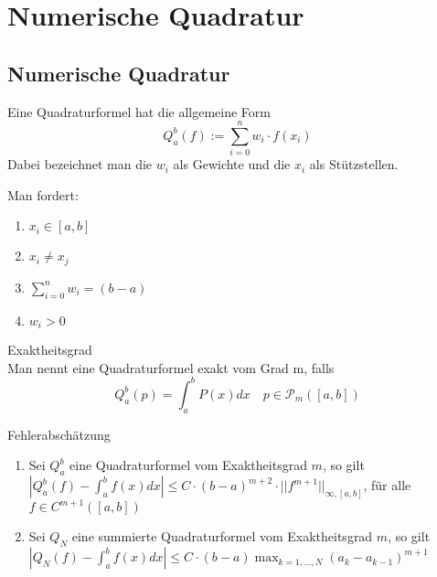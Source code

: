 \section{Numerische Quadratur}

\subsection{Numerische Quadratur}
\begin{definition}[Definition I.1]
Eine Quadraturformel hat die allgemeine Form
\begin{displaymath}
	Q_{a}^{b}(f):=\sum_{i=0}^{n}w_{i}\cdot f(x_{i})
\end{displaymath}
Dabei bezeichnet man die $w_{i}$ als Gewichte und die $x_{i}$ als Stützstellen.
\end{definition}
\begin{remark} Man fordert:
	\begin{enumerate}
		\item $x_{i} \in [a,b]$
		\item $x_{i}\not = x_{j}$
		\item $\sum_{i=0}^{n}w_{i}=(b-a)$
		\item $w_{i} > 0$
	\end{enumerate}
\end{remark}

\begin{definition}
	[Definition I.2] Exaktheitsgrad
	\\
	Man nennt eine Quadraturformel exakt vom Grad m, falls
	\begin{displaymath}
		Q_{a}^{b}(p) = \int_{a}^{b} P(x) dx\quad p\in \mathcal{P}_{m}([a,b])
	\end{displaymath}
\end{definition}

\begin{theorem}
[Satz I.1] Fehlerabschätzung
	\begin{enumerate}
		\item Sei $Q_{a}^{b}$ eine Quadraturformel vom Exaktheitsgrad $m$, so gilt $|Q_{a}^{b}(f)-\int_{a}^{b}f(x) dx|\leq 
		C\cdot (b-a)^{m+2}\cdot ||f^{m+1}||_{\infty,[a,b]}$, für alle $f\in C^{m+1}([a,b])$
		\item Sei $Q_{N}$ eine summierte Quadraturformel vom Exaktheitsgrad $m$, so gilt $|Q_{N}(f)-\int_{a}^{b}f(x)dx|\leq
		C\cdot (b-a)\max_{k=1,\ldots,N}(a_{k}-a_{k-1})^{m+1}$
	\end{enumerate}
\end{theorem}

